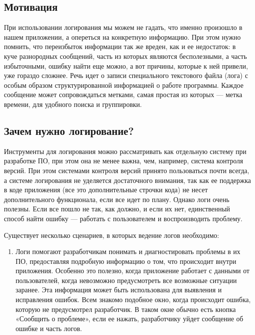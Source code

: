 \documentclass[letterpaper,10pt,russian]{sphinxmanual}
\begin{document}
\subsection{Мотивация}
\label{\detokenize{educational_materials/logging/content:id2}}
\sphinxAtStartPar
При использовании логирования мы можем не гадать, что именно произошло в нашем приложении, а опереться на конкретную информацию. При этом нужно помнить, что переизбыток информации так же вреден, как и ее недостаток: в куче разнородных сообщений, часть из которых являются бесполезными, а часть избыточными, ошибку найти еще можно, а вот причины, которые к ней привели, уже гораздо сложнее. Речь идет о записи специального текстового файла (лога) с особым образом структурированной информацией о работе программы. Каждое сообщение может сопровождаться метками, самая простая из которых — метка времени, для удобного поиска и группировки.


\subsection{Зачем нужно логирование?}
\label{\detokenize{educational_materials/logging/content:id3}}
\sphinxAtStartPar
Инструменты для логирования можно рассматривать как отдельную систему при разработке ПО, при этом она не менее важна, чем, например, система контроля версий. При этом системами контроля версий принято пользоваться почти всегда, а системе логирования не уделяется достаточного внимания, так как ее поддержка в коде приложения (все это дополнительные строчки кода) не несет дополнительного функционала, если все идет по плану. Однако логи очень полезны. Если все пошло не так, как должно, и если их нет, единственный способ найти ошибку — работать с пользователем и воспроизводить проблему.

\sphinxAtStartPar
Существует несколько сценариев, в которых ведение логов необходимо:
\begin{enumerate}
%
\item {} 
\sphinxAtStartPar
{}
Логи помогают разработчикам понимать и диагностировать проблемы в их ПО, предоставляя подробную информацию о том, что происходит внутри приложения. Особенно это полезно, когда приложение работает с данными от пользователей, когда невозможно предусмотреть все возможные ситуации заранее. Эта информация может быть использована для выявления и исправления ошибок. Всем знакомо подобное окно, когда происходит ошибка, которую не предусмотрел разработчик. В таком окне обычно есть кнопка «Сообщить о проблеме», если ее нажать, разработчику уйдет сообщение об ошибке и часть логов.

\end{enumerate}
\end{document}
